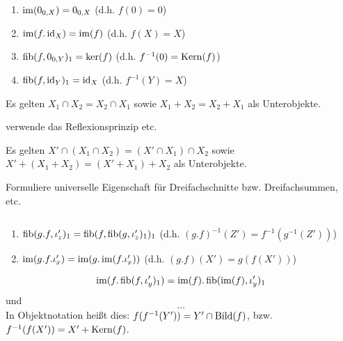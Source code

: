 \begin{lemm}[Regel (a)] $\quad$ %
\begin{enumerate}
\item $\operatorname{im}(0_{0,X}) = 0_{0,X}$ (d.h. $f(0) = 0$)
\item $\operatorname{im}(f.\operatorname{id}_X) = \operatorname{im}(f)$ (d.h. $f(X) = X$)
\item $\operatorname{fib}(f,0_{0,Y})_1 = \ker(f)$ (d.h. $f^{-1}(0) = \operatorname{Kern}(f)$)
\item $\operatorname{fib}(f,\operatorname{id}_Y)_1 = \operatorname{id}_X$ (d.h. $f^{-1}(Y) = X$)
\end{enumerate}
\end{lemm}

\begin{lemm}[Regel (b)]
Es gelten $X_1 \cap X_2 = X_2 \cap X_1$
sowie $X_1 + X_2 = X_2 + X_1$ als Unterobjekte.
\end{lemm}
\begin{bew}
verwende das Reflexionsprinzip etc.
\end{bew}

\begin{lemm}[Regel (c)]
Es gelten $X' \cap (X_1 \cap X_2) = (X' \cap X_1) \cap X_2$ 
sowie $X' + (X_1 + X_2) = (X' + X_1) + X_2$ als Unterobjekte.
\end{lemm}
\begin{bew}
Formuliere universelle Eigenschaft für Dreifachschnitte bzw. Dreifachsummen, etc.
\end{bew}

\begin{lemm}[Regel (d)] $\quad$ %
\begin{enumerate}
\item $\operatorname{fib}(g.f, \iota_z')_1 = \operatorname{fib}(f, \operatorname{fib}(g, \iota_z')_1)_1$ (d.h. $(g.f)^{-1}(Z') = f^{-1}(g^{-1}(Z'))$)
\item $\operatorname{im}(g.f.\iota_x') = \operatorname{im}(g.\operatorname{im}(f.\iota_x'))$ (d.h. $(g.f)(X') = g(f(X'))$)
\end{enumerate}
\end{lemm}

\begin{lemm}[Regel (e)]
\[
\operatorname{im}(f.\operatorname{fib}(f,\iota_y')_1) = \operatorname{im}(f).\operatorname{fib}(\operatorname{im}(f),\iota_y')_1
\]
und
\[
\ldots %
\]
In Objektnotation heißt dies: $f(f^{-1}(Y')) = Y' \cap \operatorname{Bild}(f)$, bzw. $f^{-1}(f(X')) = X' + \operatorname{Kern}(f)$.
\end{lemm}

